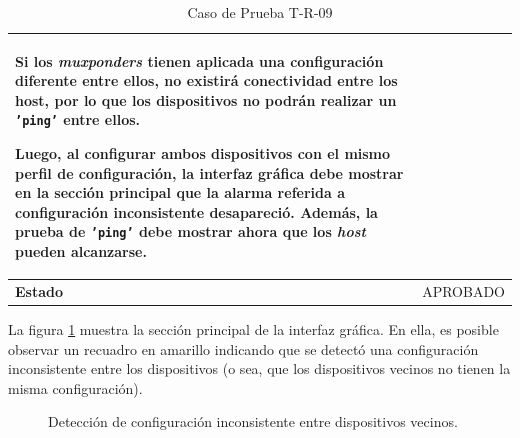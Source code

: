 \begin{table}[H]
\begin{tabular}{ |m{2.5cm}|m{11cm}|  }
        Si los \textit{muxponders} tienen aplicada una configuración diferente entre ellos, no existirá conectividad entre los host, por lo que los dispositivos no podrán realizar un \texttt{'ping'} entre ellos.
 
        Luego, al configurar ambos dispositivos con el mismo perfil de configuración, la interfaz gráfica debe mostrar en la sección principal que la alarma referida a configuración inconsistente desapareció. Además, la prueba de \texttt{'ping'} debe mostrar ahora que los \textit{host} pueden alcanzarse.
          \\
        
          \hline
        \centering
          \textbf{Estado}    & APROBADO  \\
        \hline
        \end{tabular}
        
        \caption{Caso de Prueba T-R-09}
        \label{tab:TR09}
        \end{table}

      La figura \ref{fig:test9_1} muestra la sección principal de la interfaz gráfica. En ella, es posible observar un recuadro en amarillo indicando que se detectó una configuración inconsistente entre los dispositivos (o sea, que los dispositivos vecinos no tienen la misma configuración). 

      \begin{figure}[H]
        \centering
        \caption{Detección de configuración inconsistente entre dispositivos vecinos.}
        \label{fig:test9_1}
      \end{figure}

